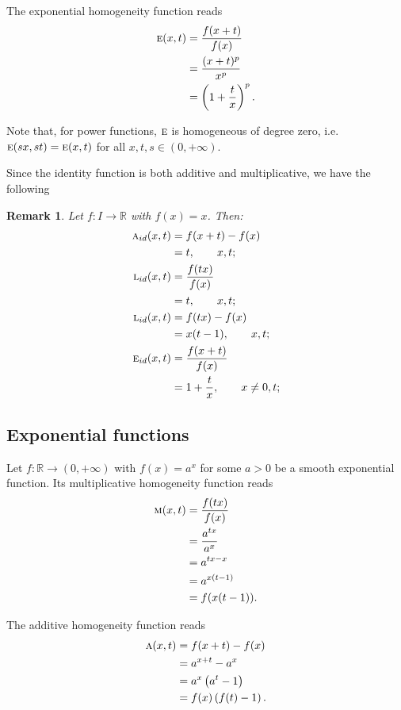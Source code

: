 \documentclass{amsart}
\theoremstyle{plain}
\newtheorem{remark}{Remark}
\numberwithin{equation}{section}
\newcommand{\ah}{\textsc{a}}
\newcommand{\lh}{\textsc{l}}
\newcommand{\eh}{\textsc{e}}
\newcommand{\R}{{\mathbb{R}}}
\begin{document}
The exponential homogeneity function reads
\begin{align*}
\eh(x,t)&=\frac{f(x+t)}{f(x)}\\
&=\frac{(x+t)^p}{x^p}\\
&=\left(1 + \frac{t}{x}\right)^p.
\end{align*}

Note that, for power functions, $\eh$ is homogeneous of degree zero,
i.e. $\eh(sx,st)=\eh(x,t)$ for all $x,t,s \in (0, +\infty)$. 

Since the identity function is both additive and multiplicative,
 we have the following
\begin{remark}
Let $f: I \to \R $ with $f(x)=x$.
Then:
\begin{align*}
\ah_{id}(x,t) &= {f(x+t)}-{f(x)} \\
&= t, \qquad x,t;\\
\lh_{id}(x,t) &= \frac{f(tx)}{f(x)}\\
&= t, \qquad x,t;\\
\lh_{id}(x,t) &= {f(tx)}-{f(x)}\\
&= x(t-1), \qquad x,t;\\
\eh_{id}(x,t) &= \frac{f(x+t)}{f(x)}  \\
&=1 + \frac{t}{x}, \qquad  x \neq 0, t; 
\end{align*}
\end{remark}


\subsection{Exponential functions}
Let $f: \R \to (0, +\infty)$ with $f(x)=a^x$ for some $a>0$ be a smooth exponential function.
Its multiplicative homogeneity function reads
\begin{align*}
	\textsc{m}(x,t)&=\frac{f(tx)}{f(x)}\\
	&=\frac{a^{tx}}{a^{x}}\\
	&= a^{tx-x}\\
	&= a^{x(t-1)}\\
	&=
	f(x(t-1)).
\end{align*}

The additive homogeneity function reads
\begin{align*}
	\textsc{a}(x,t)&=f(x+t)-f(x)\\
	&=a^{x+t}-{a^{x}}\\
	&= a^{x} \left(a^t-1 \right)\\
	&= f(x) \left( f(t)-1 \right).
\end{align*}
\end{document}
